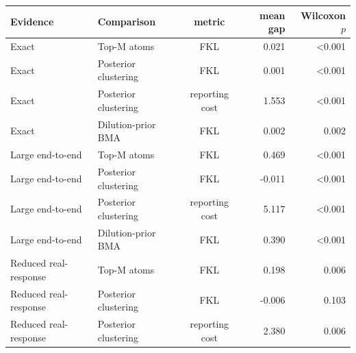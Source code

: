 \begin{tabular}{llcrr}
\toprule
Evidence & Comparison & metric & mean gap & Wilcoxon $p$ \\
\midrule
Exact & Top-M atoms & FKL & 0.021 & <0.001 \\
Exact & Posterior clustering & FKL & 0.001 & <0.001 \\
Exact & Posterior clustering & reporting cost & 1.553 & <0.001 \\
Exact & Dilution-prior BMA & FKL & 0.002 & 0.002 \\
Large end-to-end & Top-M atoms & FKL & 0.469 & <0.001 \\
Large end-to-end & Posterior clustering & FKL & -0.011 & <0.001 \\
Large end-to-end & Posterior clustering & reporting cost & 5.117 & <0.001 \\
Large end-to-end & Dilution-prior BMA & FKL & 0.390 & <0.001 \\
Reduced real-response & Top-M atoms & FKL & 0.198 & 0.006 \\
Reduced real-response & Posterior clustering & FKL & -0.006 & 0.103 \\
Reduced real-response & Posterior clustering & reporting cost & 2.380 & 0.006 \\
\bottomrule
\end{tabular}
